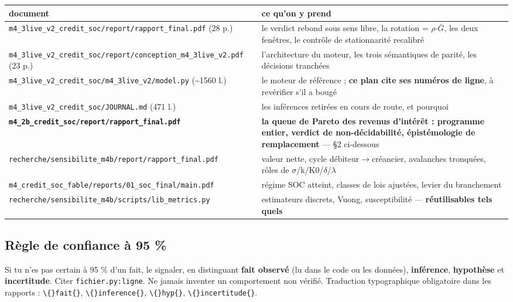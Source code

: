 \documentclass[11pt,a4paper]{article}
\newcommand{\code}[1]{\texttt{#1}}
\begin{document}
\begin{center}
\begin{tabularx}{\linewidth}{@{}XX@{}}
\toprule
\textbf{document} & \textbf{ce qu'on y prend} \\
\midrule
\code{m4\_3live\_v2\_credit\_soc/report/rapport\_final.pdf} (28 p.) & le verdict rebond sous sens libre, la rotation = \ensuremath{\rho}\ensuremath{\cdot}\ensuremath{\bar{G}}, les deux fenêtres, le contrôle de stationnarité recalibré \\
\code{m4\_3live\_v2\_credit\_soc/report/conception\_m4\_3live\_v2.pdf} (23 p.) & l'architecture du moteur, les trois sémantiques de parité, les décisions tranchées \\
\code{m4\_3live\_v2\_credit\_soc/m4\_3live\_v2/model.py} (\textasciitilde{}1560 l.) & le moteur de référence ; \textbf{ce plan cite ses numéros de ligne}, à revérifier s'il a bougé \\
\code{m4\_3live\_v2\_credit\_soc/JOURNAL.md} (471 l.) & les inférences retirées en cours de route, et pourquoi \\
\textbf{\code{m4\_2b\_credit\_soc/report/rapport\_final.pdf}} & \textbf{la queue de Pareto des revenus d'intérêt : programme entier, verdict de non-décidabilité, épistémologie de remplacement} --- §2 ci-dessous \\
\code{recherche/sensibilite\_m4b/report/rapport\_final.pdf} & valeur nette, cycle débiteur\ensuremath{\rightarrow}créancier, avalanches tronquées, rôles de \ensuremath{\sigma}/k/K0/\ensuremath{\delta}/\ensuremath{\lambda} \\
\code{m4\_credit\_soc\_fable/reports/01\_soc\_final/main.pdf} & régime SOC atteint, classes de lois ajustées, levier du branchement \\
\code{recherche/sensibilite\_m4b/scripts/lib\_metrics.py} & estimateurs discrets, Vuong, susceptibilité --- \textbf{réutilisables tels quels} \\
\bottomrule
\end{tabularx}
\end{center}

\subsection*{Règle de confiance à 95 \%}

Si tu n'es pas certain à 95 \% d'un fait, le signaler, en distinguant \textbf{fait observé} (lu dans le code ou les données), \textbf{inférence}, \textbf{hypothèse} et \textbf{incertitude}. Citer \code{fichier.py:ligne}. Ne jamais inventer un comportement non vérifié. Traduction typographique obligatoire dans les rapports : \code{\textbackslash\{\}fait\{\}}, \code{\textbackslash\{\}inference\{\}}, \code{\textbackslash\{\}hyp\{\}}, \code{\textbackslash\{\}incertitude\{\}}.
\end{document}

